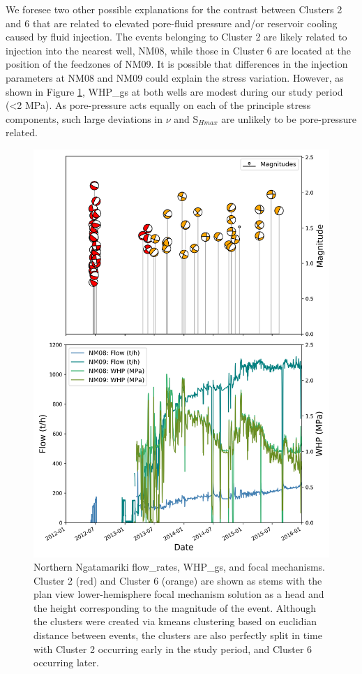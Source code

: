 We foresee two other possible explanations for the contrast between Clusters 2 and 6 that are related to elevated pore-fluid pressure and\slash{or} reservoir cooling caused by fluid injection. The events belonging to Cluster 2 are likely related to injection into the nearest well, NM08, while those in Cluster 6 are located at the position of the \glspl{feedzone} of NM09. It is possible that differences in the injection parameters at NM08 and NM09 could explain the stress variation. However, as shown in Figure \ref{clust26}, \glspl{WHP_g} at both wells are modest during our study period (\textless{2} MPa). As pore-pressure acts equally on each of the principle stress components, such large deviations in $\nu$ and S$_{Hmax}$ are unlikely to be pore-pressure related. 

\begin{figure}[h!]
\begin{center}
\includegraphics[width=0.84\columnwidth]{Chapter_5_FMs/figures/clust_2-6_comparison/NgaN_ALL_kmeans10_clusters_flow}
\caption[Ngatamariki Clusters 2 and 6 relative to injection flow rate]{{
Northern Ngatamariki \glspl{flow_rate}, \glspl{WHP_g}, and focal mechanisms. Cluster 2 (red) and Cluster 6 (orange) are shown as stems with the plan view lower-hemisphere focal mechanism solution as a head and the height corresponding to the magnitude of the event. Although the clusters were created via kmeans clustering based on euclidian distance between events, the clusters are also perfectly split in time with Cluster 2 occurring early in the study period, and Cluster 6 occurring later.
{\label{clust26}}%
}}
\end{center}
\end{figure}

